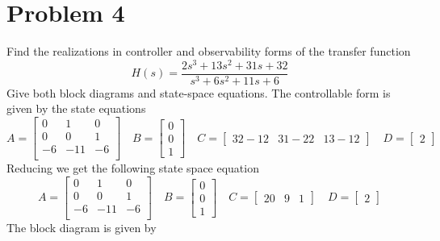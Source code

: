 \documentclass{article}
\begin{document}
\section*{Problem 4}
Find the realizations in controller and observability forms of the transfer function
$$ H(s) = \frac{2s^3+13s^2+31s+32}{s^3+6s^2+11s+6} $$
Give both block diagrams and state-space equations.
\newline
\newline
The controllable form is given by the state equations
$$
A =
\begin{bmatrix}
 0 &  1  &  0 \\
 0 &  0  &  1 \\
-6 & -11 & -6 \\
\end{bmatrix}
\quad
B =
\begin{bmatrix} 0 \\ 0 \\ 1 \end{bmatrix}
\quad
C =
\begin{bmatrix}
32 - 12 & 31 - 22 & 13 - 12 
\end{bmatrix}
\quad
D =
\begin{bmatrix}
2
\end{bmatrix}
$$
Reducing we get the following state space equation
$$
A =
\begin{bmatrix}
 0 &  1  &  0 \\
 0 &  0  &  1 \\
-6 & -11 & -6 \\
\end{bmatrix}
\quad
B =
\begin{bmatrix} 0 \\ 0 \\ 1 \end{bmatrix}
\quad
C =
\begin{bmatrix}
20 & 9 & 1
\end{bmatrix}
\quad
D =
\begin{bmatrix}
2
\end{bmatrix}
$$
The block diagram is given by
\end{document}
